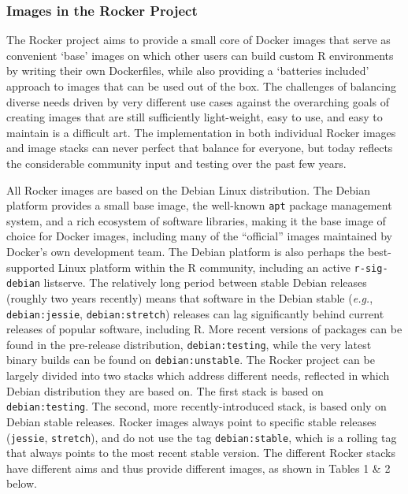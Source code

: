 \subsubsection{Images in the Rocker
Project}\label{images-in-the-rocker-project}

The Rocker project aims to provide a small core of Docker images that
serve as convenient `base' images on which other users can build custom
R environments by writing their own Dockerfiles, while also providing a
`batteries included' approach to images that can be used out of the box.
The challenges of balancing diverse needs driven by very different use
cases against the overarching goals of creating images that are still
sufficiently light-weight, easy to use, and easy to maintain is a
difficult art. The implementation in both individual Rocker images and
image stacks can never perfect that balance for everyone, but today
reflects the considerable community input and testing over the past few
years.

All Rocker images are based on the Debian Linux distribution. The Debian
platform provides a small base image, the well-known \texttt{apt}
package management system, and a rich ecosystem of software libraries,
making it the base image of choice for Docker images, including many of
the ``official'' images maintained by Docker's own development team. The
Debian platform is also perhaps the best-supported Linux platform within
the R community, including an active \texttt{r-sig-debian} listserve.
The relatively long period between stable Debian releases (roughly two
years recently) means that software in the Debian stable (\emph{e.g.},
\texttt{debian:jessie}, \texttt{debian:stretch}) releases can lag
significantly behind current releases of popular software, including R.
More recent versions of packages can be found in the pre-release
distribution, \texttt{debian:testing}, while the very latest binary
builds can be found on \texttt{debian:unstable}. The Rocker project can
be largely divided into two stacks which address different needs,
reflected in which Debian distribution they are based on. The first
stack is based on \texttt{debian:testing}. The second, more
recently-introduced stack, is based only on Debian stable releases.
Rocker images always point to specific stable releases (\texttt{jessie},
\texttt{stretch}), and do not use the tag \texttt{debian:stable}, which
is a rolling tag that always points to the most recent stable version.
The different Rocker stacks have different aims and thus provide
different images, as shown in Tables 1 \& 2 below.

